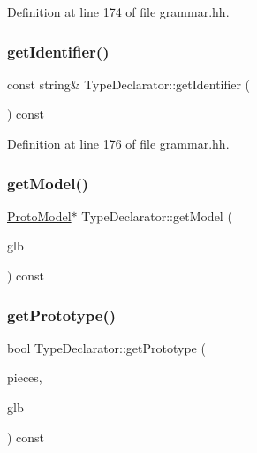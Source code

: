 Definition at line 174 of file grammar.\+hh.

\mbox{\label{class_type_declarator_ada70627420d0ae640cde706ede4dccf5}} 
\subsubsection{\texorpdfstring{getIdentifier()}{getIdentifier()}}
{\footnotesize\ttfamily const string\& Type\+Declarator\+::get\+Identifier (\begin{DoxyParamCaption}\item[{void}]{ }\end{DoxyParamCaption}) const\hspace{0.3cm}{\ttfamily [inline]}}



Definition at line 176 of file grammar.\+hh.

\mbox{\label{class_type_declarator_ac6dde9a81f0769baa9918eddfa7f86bb}} 
\subsubsection{\texorpdfstring{getModel()}{getModel()}}
{\footnotesize\ttfamily \mbox{\hyperlink{class_proto_model}{Proto\+Model}}$\ast$ Type\+Declarator\+::get\+Model (\begin{DoxyParamCaption}\item[{\mbox{\hyperlink{class_architecture}{Architecture}} $\ast$}]{glb }\end{DoxyParamCaption}) const}

\mbox{\label{class_type_declarator_a25458405bc1eeac18d85ff4e06ebb37b}} 
\subsubsection{\texorpdfstring{getPrototype()}{getPrototype()}}
{\footnotesize\ttfamily bool Type\+Declarator\+::get\+Prototype (\begin{DoxyParamCaption}\item[{\mbox{\hyperlink{struct_prototype_pieces}{Prototype\+Pieces}} \&}]{pieces,  }\item[{\mbox{\hyperlink{class_architecture}{Architecture}} $\ast$}]{glb }\end{DoxyParamCaption}) const}

